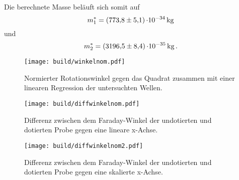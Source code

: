 Die berechnete Masse beläuft sich somit auf 
\begin{equation*}
    m^*_1 = \SI{773.8 \pm 5.1}{\cdot 10^{-34}}\,\si{\kilo\gram}\, \\
\end{equation*}
und
\begin{equation*}
    m^*_2 = \SI{3196.5 \pm 8.4}{\cdot 10^{-35}}\,\si{\kilo\gram} \,.   \\
\end{equation*}

\begin{figure}[H]
    \centering
    \texttt{[image: build/winkelnom.pdf]}
    \caption{Normierter Rotationswinkel gegen das Quadrat zusammen mit einer linearen Regression der untersuchten Wellen.}
    \label{fig:Winkel_nom}
\end{figure}


\begin{figure}[H]
    \centering
    \texttt{[image: build/diffwinkelnom.pdf]}
    \caption{Differenz zwischen dem Faraday-Winkel der undotierten und dotierten Probe gegen eine lineare x-Achse.}
    \label{fig:Winkel_nom_diff}
\end{figure}


\begin{figure}[H]
    \centering
    \texttt{[image: build/diffwinkelnom2.pdf]}
    \caption{Differenz zwischen dem Faraday-Winkel der undotierten und dotierten Probe gegen eine skalierte x-Achse.}
    \label{fig:Winkel_nom_diff2}
\end{figure}


